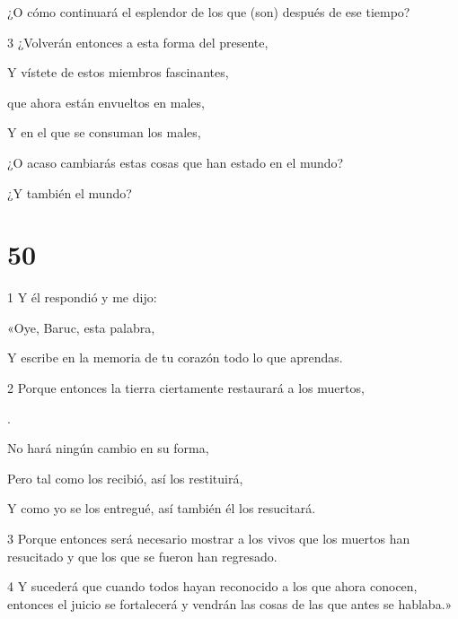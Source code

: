 \par ¿O cómo continuará el esplendor de los que (son) después de ese tiempo?

\par 3 ¿Volverán entonces a esta forma del presente,

\par Y vístete de estos miembros fascinantes,

\par que ahora están envueltos en males,

\par Y en el que se consuman los males,

\par ¿O acaso cambiarás estas cosas que han estado en el mundo?

\par ¿Y también el mundo?

\chapter{50}

\par 1 Y él respondió y me dijo:

\par «Oye, Baruc, esta palabra,

\par Y escribe en la memoria de tu corazón todo lo que aprendas.

\par 2 Porque entonces la tierra ciertamente restaurará a los muertos,

\par [Que ahora recibe, para poder conservarlos].

\par No hará ningún cambio en su forma,

\par Pero tal como los recibió, así los restituirá,

\par Y como yo se los entregué, así también él los resucitará.

\par 3 Porque entonces será necesario mostrar a los vivos que los muertos han resucitado y que los que se fueron han regresado.

\par 4 Y sucederá que cuando todos hayan reconocido a los que ahora conocen, entonces el juicio se fortalecerá y vendrán las cosas de las que antes se hablaba.»

